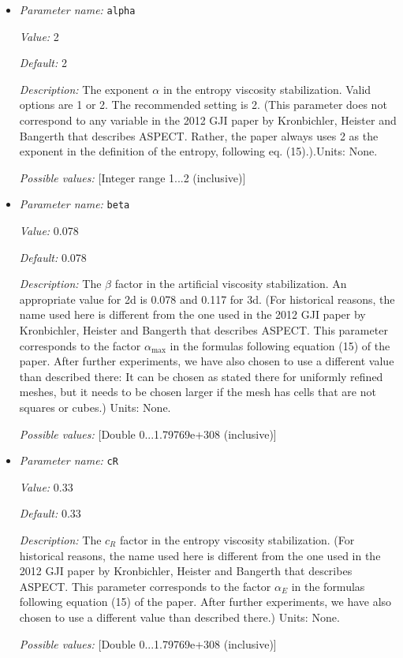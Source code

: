 \begin{itemize}
\item {\it Parameter name:} {\tt alpha}


{\it Value:} 2


{\it Default:} 2


{\it Description:} The exponent $\alpha$ in the entropy viscosity stabilization. Valid options are 1 or 2. The recommended setting is 2. (This parameter does not correspond to any variable in the 2012 GJI paper by Kronbichler, Heister and Bangerth that describes ASPECT. Rather, the paper always uses 2 as the exponent in the definition of the entropy, following eq. (15).).Units: None.


{\it Possible values:} [Integer range 1...2 (inclusive)]
\item {\it Parameter name:} {\tt beta}


{\it Value:} 0.078


{\it Default:} 0.078


{\it Description:} The $\beta$ factor in the artificial viscosity stabilization. An appropriate value for 2d is 0.078 and 0.117 for 3d. (For historical reasons, the name used here is different from the one used in the 2012 GJI paper by Kronbichler, Heister and Bangerth that describes ASPECT. This parameter corresponds to the factor $\alpha_\text {max}$ in the formulas following equation (15) of the paper. After further experiments, we have also chosen to use a different value than described there: It can be chosen as stated there for uniformly refined meshes, but it needs to be chosen larger if the mesh has cells that are not squares or cubes.) Units: None.


{\it Possible values:} [Double 0...1.79769e+308 (inclusive)]
\item {\it Parameter name:} {\tt cR}


{\it Value:} 0.33


{\it Default:} 0.33


{\it Description:} The $c_R$ factor in the entropy viscosity stabilization. (For historical reasons, the name used here is different from the one used in the 2012 GJI paper by Kronbichler, Heister and Bangerth that describes ASPECT. This parameter corresponds to the factor $\alpha_E$ in the formulas following equation (15) of the paper. After further experiments, we have also chosen to use a different value than described there.) Units: None.


{\it Possible values:} [Double 0...1.79769e+308 (inclusive)]
\end{itemize}

